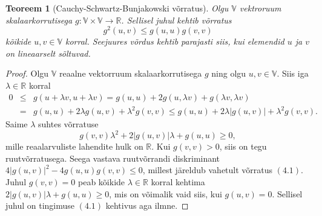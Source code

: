 \documentclass[a4paper,12pt]{article}
\newtheorem{teoreem}{Teoreem}[section]
\numberwithin{equation}{section}
\begin{document}
\begin{teoreem}[Cauchy-Schwartz-Bunjakowski võrratus]
Olgu $\mathbb{V}$ vektroruum skalaarkorrutisega $g : \mathbb{V} \times \mathbb{V} \rightarrow \mathbb{R}$. Sellisel juhul kehtib võrratus
\begin{equation}
g^2 \left(u, v \right) \leq g \left(u, u \right) g \left(v, v \right)
\end{equation}
kõikide $u, v \in \mathbb{V}$ korral. Seejuures võrdus kehtib parajasti siis, kui elemendid $u$ ja $v$ on lineaarselt sõltuvad.
\end{teoreem}

%
%
\begin{proof}
Olgu $\mathbb{V}$ reaalne vektorruum skalaarkorrutisega $g$ ning olgu $u, v \in \mathbb{V}$. Siis iga $\lambda \in \mathbb{R}$ korral
\begin{eqnarray*}
0 &\leq& g\left(u+\lambda v,u+\lambda v\right) = g\left(u,u\right) + 2g\left(u, \lambda v \right) + g\left(\lambda v, \lambda v\right) \\
&=& g\left(u,u\right) + 2\lambda g\left(u, v \right) + \lambda^2 g\left(v,v\right) \leq g\left(u,u\right) + 2\lambda | g\left(u, v \right)| + \lambda^2 g\left(v,v\right).
\end{eqnarray*}
Saime $\lambda$ suhtes võrratuse 
\[ g\left(v,v\right)\lambda^2 + 2|g\left(u, v \right)|\lambda + g\left(u,u\right) \geq 0, \]
mille reaalarvuliste lahendite hulk on $\mathbb{R}$. Kui $g\left(v,v\right) > 0$, siis on tegu ruutvõrratusega. Seega vastava ruutvõrrandi diskriminant $4|g\left(u,v\right)|^2 - 4g\left(u,u\right)g\left(v,v\right) \leq 0$, millest järeldub vahetult võrratus $(4.1)$. Juhul $g\left(v,v\right) = 0$ peab kõikide $\lambda \in \mathbb{R}$ korral kehtima $2|g\left(u,v\right)|\lambda + g\left(u,u\right) \geq 0$, mis on võimalik vaid siis, kui $g\left(u,v\right) = 0$. Sellisel juhul on tingimuse $(4.1)$ kehtivus aga ilmne.

\end{proof}
\end{document}
